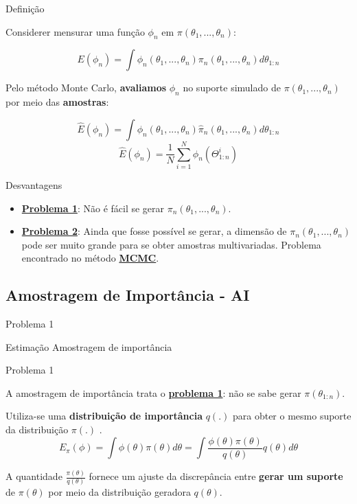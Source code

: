 \documentclass{beamer}
\begin{document}
\begin{frame}{Definição}

Considerer mensurar uma função $\phi_n$ em $\pi(\theta_1,...,\theta_n)$:

$$
E(\phi_n) =  \int \phi_n(\theta_1,...,\theta_n)\pi_n(\theta_1,...,\theta_n)d\theta_{1:n}
$$
\pause

Pelo método Monte Carlo, \textbf{avaliamos}  $\phi_n$ no suporte simulado de $\pi(\theta_1,...,\theta_n)$ por meio das \textbf{amostras}:

$$
\hat{E}(\phi_n) = \int \phi_n(\theta_1,...,\theta_n)\hat{\pi}_n(\theta_1,...,\theta_n)d\theta_{1:n}
$$
\pause
$$
\hat{E}(\phi_n) = \frac{1}{N} \sum_{i=1}^N \phi_n(\Theta^i_{1:n})
$$


\end{frame}

\begin{frame}{Desvantagens}


\begin{itemize}

\item[] \underline{\textbf{Problema 1}}: Não é fácil se gerar $\pi_n(\theta_1,...,\theta_n)$.
\pause 

\vspace{.5cm}
\item[] \underline{\textbf{Problema 2}}: Ainda que fosse possível se gerar, a dimensão de $\pi_n(\theta_1,...,\theta_n)$ pode ser muito grande para se obter amostras multivariadas. Problema encontrado no método \underline{\textbf{MCMC}}.

\end{itemize}
\end{frame}


\subsection{Amostragem de Importância - AI}

\begin{frame}{Problema 1}
    \begin{block}{Estimação}
      \Huge  Amostragem de importância
    \end{block}
\end{frame}


\begin{frame}{Problema 1}

A amostragem de importância trata o \textbf{\underline{problema 1}}: não se sabe gerar $\pi(\theta_{1:n})$.

\vspace{0.5cm}
\pause

Utiliza-se uma \textbf{distribuição de importância} $q(.)$ para obter o mesmo suporte da distribuição $\pi(.)$ .
$$
E_{\pi}(\phi)=\int \phi(\theta) \pi(\theta) d\theta = \int \frac{ \phi(\theta) \pi(\theta)}{q(\theta)} q(\theta) d\theta
$$

\pause
A quantidade $\frac{\pi(\theta)}{q(\theta)}$  fornece um ajuste da discrepância entre \textbf{gerar um suporte} de $\pi(\theta)$ por meio da distribuição geradora $q(\theta)$.

\end{frame}
\end{document}
